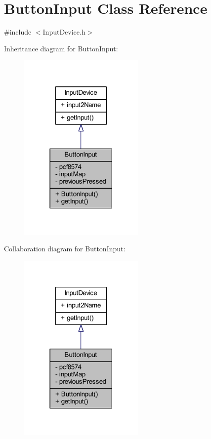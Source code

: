 \hypertarget{class_button_input}{}\section{Button\+Input Class Reference}
\label{class_button_input}


{\ttfamily \#include $<$Input\+Device.\+h$>$}



Inheritance diagram for Button\+Input\+:
\nopagebreak
\begin{figure}[H]
\begin{center}
\leavevmode
\includegraphics[width=174pt]{class_button_input__inherit__graph}
\end{center}
\end{figure}


Collaboration diagram for Button\+Input\+:
\nopagebreak
\begin{figure}[H]
\begin{center}
\leavevmode
\includegraphics[width=174pt]{class_button_input__coll__graph}
\end{center}
\end{figure}
